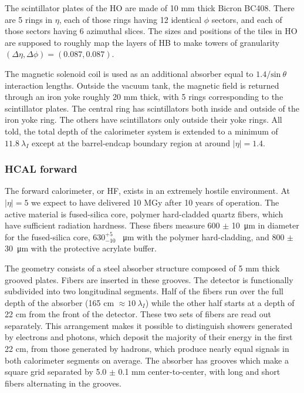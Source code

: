 The scintillator plates of the HO are made of 10 mm thick Bicron BC408. There are 5 rings in $\eta$, each of those rings having 12 identical $\phi$ sectors, and each of those sectors having 6 azimuthal slices.
The sizes and positions of the tiles in HO are supposed to roughly map the layers of HB
to make towers of granularity $(\Delta\eta, \Delta\phi) = (0.087, 0.087)$.

The magnetic solenoid coil is used as an additional absorber equal to $1.4/\textrm{sin}\:\theta$ interaction lengths.
Outside the vacuum tank, the magnetic field is returned through an iron yoke roughly 20 mm thick, with 5 rings corresponding to the scintillator plates.
The central ring has scintillators both inside and outside of the iron yoke ring.
The others have scintillators only outside their yoke rings.
All told, the total depth of the calorimeter system is extended to a minimum of
$11.8\:\lambda_I$ except at the barrel-endcap boundary region at around $|\eta|=1.4$.

\subsubsection{HCAL forward}
The forward calorimeter, or HF, exists in an extremely hostile environment. 
At $|\eta|=5$ we expect to have delivered 10 MGy after 10 years of operation.
The active material is fused-silica core, polymer hard-cladded quartz fibers, which have sufficient radiation hardness.
These fibers measure 600 $\pm$ \SI{10}{\micro\meter} in diameter for the fused-silica core,
$ {630}^{+5}_{-10}$ \SI{}{\micro\meter} with the polymer hard-cladding, 
and 800 $\pm$ \SI{30}{\micro\meter} with the protective acrylate buffer.

The geometry consists of a steel absorber structure composed of 5 mm thick grooved
plates. Fibers are inserted in these grooves.
The detector is functionally subdivided into two longitudinal segments. 
Half of the fibers run over the full depth of the absorber (165 cm $\approx 10\:\lambda_I$)
while the other half starts at a depth of 22 cm from the front of the detector.
These two sets of fibers are read out separately. 
This arrangement makes it possible to distinguish showers generated by electrons and photons,
which deposit the majority of their energy in the first 22 cm,
from those generated by hadrons, which produce nearly equal signals in both calorimeter segments on average. 
The absorber has grooves which make a square grid separated by 5.0 $\pm$ 0.1 mm center-to-center, with long and short fibers alternating in the grooves. 

